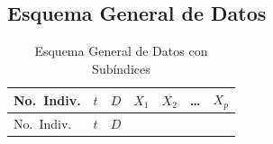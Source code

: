 \documentclass[
]{article}
\begin{document}
\subsection{Esquema General de Datos}\label{esquema-general-de-datos}

\begin{longtable}[]{@{}
  >{\raggedright\arraybackslash}p{}
  >{\raggedright\arraybackslash}p{}
  >{\raggedright\arraybackslash}p{}
  >{\raggedright\arraybackslash}p{}
  >{\raggedright\arraybackslash}p{}
  >{\raggedright\arraybackslash}p{}
  >{\raggedright\arraybackslash}p{}@{}}
\caption{Esquema General de Datos con Subíndices}\tabularnewline
\toprule\noalign{}
\begin{minipage}[b]{\linewidth}\raggedright
No.~Indiv.
\end{minipage} & \begin{minipage}[b]{\linewidth}\raggedright
\(t\)
\end{minipage} & \begin{minipage}[b]{\linewidth}\raggedright
\(D\)
\end{minipage} & \begin{minipage}[b]{\linewidth}\raggedright
\(X_1\)
\end{minipage} & \begin{minipage}[b]{\linewidth}\raggedright
\(X_2\)
\end{minipage} & \begin{minipage}[b]{\linewidth}\raggedright
\ldots{}
\end{minipage} & \begin{minipage}[b]{\linewidth}\raggedright
\(X_p\)
\end{minipage} \\
\midrule\noalign{}
\endfirsthead
\toprule\noalign{}
\begin{minipage}[b]{\linewidth}\raggedright
No.~Indiv.
\end{minipage} & \begin{minipage}[b]{\linewidth}\raggedright
\(t\)
\end{minipage} & \begin{minipage}[b]{\linewidth}\raggedright
\(D\)
\end{minipage} & \begin{minipage}[b]{\linewidth}\raggedright

\end{minipage}
\end{longtable}
\end{document}
